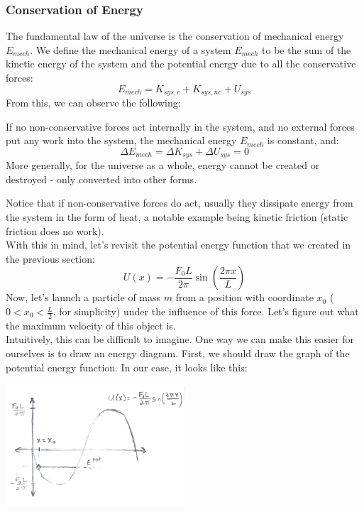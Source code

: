 \subsubsection{Conservation of Energy}
The fundamental law of the universe is the conservation of mechanical energy $E_{mech}$. We define the mechanical energy of a system $E_{mech}$ to be the sum of the kinetic energy of the system and the potential energy due to all the conservative forces:
\[
	E_{mech} = K_{sys, c} + K_{sys, nc} + U_{sys}
\]
From this, we can observe the following:
\begin{mdframed}[frametitle=Conservation of Mechanical Energy]
If no non-conservative forces act internally in the system, and no external forces put any work into the system, the mechanical energy $E_{mech}$ is constant, and: $$\Delta E_{mech} = \Delta K_{sys} + \Delta U_{sys} = 0$$
More generally, for the universe as a whole, energy cannot be created or destroyed - only converted into other forms.
\end{mdframed}
Notice that if non-conservative forces do act, usually they dissipate energy from the system in the form of heat, a notable example being kinetic friction (static friction does no work). \\
With this in mind, let's revisit the potential energy function that we created in the previous section:
\[
	U(x) = - \frac{F_0L}{2\pi} \sin \left(\frac{2\pi x}{L} \right)
\]
Now, let's launch a particle of mass $m$ from a position with coordinate $x_0$ ($0 < x_0 < \frac{L}{2}$, for simplicity) under the influence of this force. Let's figure out what the maximum velocity of this object is. \\
Intuitively, this can be difficult to imagine. One way we can make this easier for ourselves is to draw an energy diagram. First, we should draw the graph of the potential energy function. In our case, it looks like this:\\
\begin{center}
	\includegraphics[width=0.5\textwidth]{images/mechintro/cons-energy-1.png}\\
\end{center}
